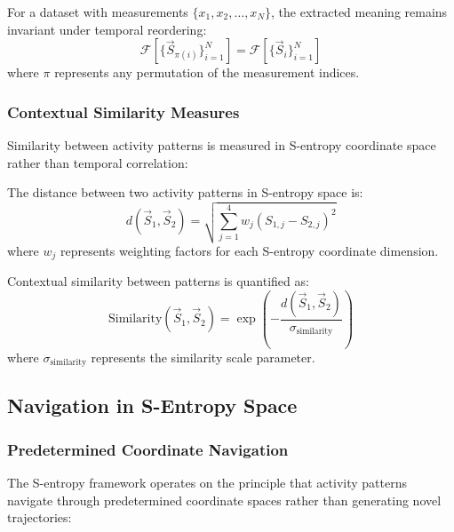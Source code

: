 \begin{theorem}
For a dataset with measurements $\{x_1, x_2, \ldots, x_N\}$, the extracted meaning remains invariant under temporal reordering:
\begin{equation}
\mathcal{F}[\{\vec{S}_{\pi(i)}\}_{i=1}^N] = \mathcal{F}[\{\vec{S}_i\}_{i=1}^N]
\end{equation}
where $\pi$ represents any permutation of the measurement indices.
\end{theorem}

\subsubsection{Contextual Similarity Measures}

Similarity between activity patterns is measured in S-entropy coordinate space rather than temporal correlation:

\begin{definition}
The distance between two activity patterns in S-entropy space is:
\begin{equation}
d(\vec{S}_1, \vec{S}_2) = \sqrt{\sum_{j=1}^{4} w_j (S_{1,j} - S_{2,j})^2}
\end{equation}
where $w_j$ represents weighting factors for each S-entropy coordinate dimension.
\end{definition}

\begin{definition}
Contextual similarity between patterns is quantified as:
\begin{equation}
\text{Similarity}(\vec{S}_1, \vec{S}_2) = \exp\left(-\frac{d(\vec{S}_1, \vec{S}_2)}{\sigma_{\text{similarity}}}\right)
\end{equation}
where $\sigma_{\text{similarity}}$ represents the similarity scale parameter.
\end{definition}

\subsection{Navigation in S-Entropy Space}

\subsubsection{Predetermined Coordinate Navigation}

The S-entropy framework operates on the principle that activity patterns navigate through predetermined coordinate spaces rather than generating novel trajectories:

